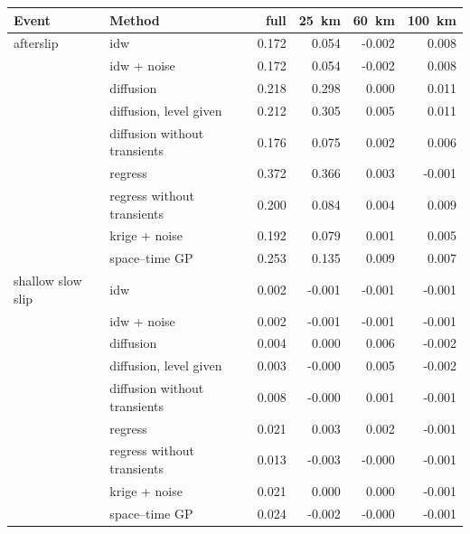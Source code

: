 \begin{tabular}{llrrrr}
\toprule
Event & Method & full & 25~km & 60~km & 100~km \\
\midrule
afterslip & idw & 0.172 & 0.054 & -0.002 & 0.008 \\
 & idw + noise & 0.172 & 0.054 & -0.002 & 0.008 \\
 & diffusion & 0.218 & 0.298 & 0.000 & 0.011 \\
 & diffusion, level given & 0.212 & 0.305 & 0.005 & 0.011 \\
 & diffusion without transients & 0.176 & 0.075 & 0.002 & 0.006 \\
 & regress & 0.372 & 0.366 & 0.003 & -0.001 \\
 & regress without transients & 0.200 & 0.084 & 0.004 & 0.009 \\
 & krige + noise & 0.192 & 0.079 & 0.001 & 0.005 \\
 & space--time GP & 0.253 & 0.135 & 0.009 & 0.007 \\
\addlinespace
shallow slow slip & idw & 0.002 & -0.001 & -0.001 & -0.001 \\
 & idw + noise & 0.002 & -0.001 & -0.001 & -0.001 \\
 & diffusion & 0.004 & 0.000 & 0.006 & -0.002 \\
 & diffusion, level given & 0.003 & -0.000 & 0.005 & -0.002 \\
 & diffusion without transients & 0.008 & -0.000 & 0.001 & -0.001 \\
 & regress & 0.021 & 0.003 & 0.002 & -0.001 \\
 & regress without transients & 0.013 & -0.003 & -0.000 & -0.001 \\
 & krige + noise & 0.021 & 0.000 & 0.000 & -0.001 \\
 & space--time GP & 0.024 & -0.002 & -0.000 & -0.001 \\
\bottomrule
\end{tabular}

